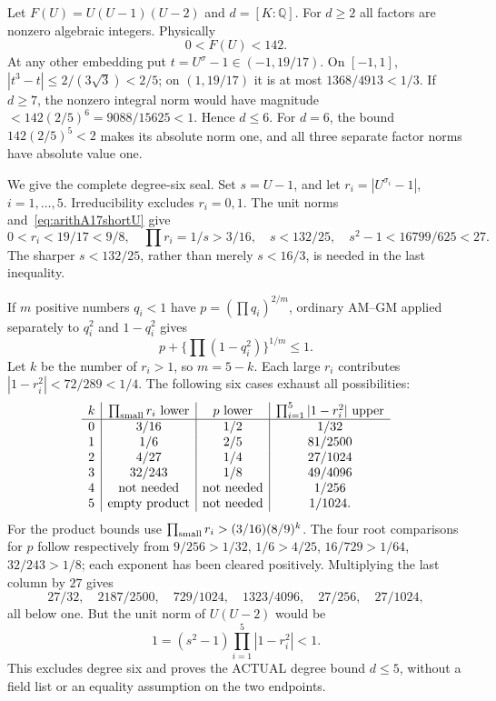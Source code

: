 \documentclass[11pt]{article}
\begin{document}
Let \(F(U)=U(U-1)(U-2)\) and \(d=[K:\mathbb Q]\).
For \(d\ge2\) all factors are nonzero algebraic integers.
Physically
\[
                    0<F(U)<142 .
\]
At any other embedding put \(t=U^\sigma-1\in(-1,19/17)\).
On \([-1,1]\), \(|t^3-t|\le2/(3\sqrt3)<2/5\);
on \((1,19/17)\) it is at most \(1368/4913<1/3\).
If \(d\ge7\), the nonzero integral norm would have magnitude
\(<142(2/5)^6=9088/15625<1\).
Hence \(d\le6\).
For \(d=6\), the bound \(142(2/5)^5<2\) makes its absolute
norm one, and all three separate factor norms have absolute
value one.

We give the complete degree-six seal.
Set \(s=U-1\), and let
\(r_i=|U^{\sigma_i}-1|\), \(i=1,\ldots,5\).
Irreducibility excludes \(r_i=0,1\).
The unit norms and~\eqref{eq:arithA17shortU} give
\[
 0<r_i<19/17<9/8,\quad
 \prod r_i=1/s>3/16,\quad s<132/25,\quad
 s^2-1<16799/625<27.
\]
The sharper \(s<132/25\), rather than merely \(s<16/3\),
is needed in the last inequality.

If \(m\) positive numbers \(q_i<1\) have
\(p=(\prod q_i)^{2/m}\), ordinary AM--GM applied separately
to \(q_i^2\) and \(1-q_i^2\) gives
\[
       p+\{\prod(1-q_i^2)\}^{1/m}\le1 .
\]
Let \(k\) be the number of \(r_i>1\), so \(m=5-k\).
Each large \(r_i\) contributes
\(|1-r_i^2|<72/289<1/4\).
The following six cases exhaust all possibilities:
\[
\begin{array}{c|c|c|c}
k&\prod_{\rm small}r_i\text{ lower}&
 p\text{ lower}&\prod_{i=1}^5|1-r_i^2|\text{ upper}\\ \hline
0&3/16&1/2&1/32\\
1&1/6&2/5&81/2500\\
2&4/27&1/4&27/1024\\
3&32/243&1/8&49/4096\\
4&\text{not needed}&\text{not needed}&1/256\\
5&\text{empty product}&\text{not needed}&1/1024 .
\end{array}
\]
For the product bounds use
\(\prod_{\rm small}r_i>(3/16)(8/9)^k\).
The four root comparisons for \(p\) follow respectively from
\(9/256>1/32\), \(1/6>4/25\), \(16/729>1/64\),
\(32/243>1/8\); each exponent has been cleared positively.
Multiplying the last column by \(27\) gives
\[
 27/32,\quad2187/2500,\quad729/1024,\quad
 1323/4096,\quad27/256,\quad27/1024,
\]
all below one.
But the unit norm of \(U(U-2)\) would be
\[
             1=(s^2-1)\prod_{i=1}^5|1-r_i^2|<1 .
\]
This excludes degree six and proves the ACTUAL degree bound
\(d\le5\), without a field list or an equality assumption on the
two endpoints.
\end{document}
